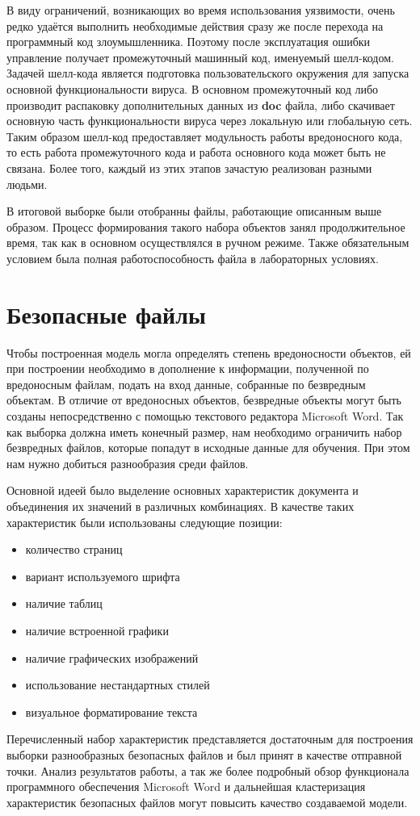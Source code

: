 В виду ограничений, возникающих во время использования уязвимости, очень редко удаётся выполнить необходимые действия сразу же после перехода на программный код злоумышленника.
Поэтому после эксплуатация ошибки управление получает промежуточный машинный код, именуемый шелл-кодом.
Задачей шелл-кода является подготовка пользовательского окружения для запуска основной функциональности вируса.
В основном промежуточный код либо производит распаковку дополнительных данных из \textbf{doc} файла, либо скачивает основную часть функциональности вируса через локальную или глобальную сеть.
Таким образом шелл-код предоставляет модульность работы вредоносного кода, то есть работа промежуточного кода и работа основного кода может быть не связана.
Более того, каждый из этих этапов зачастую реализован разными людьми.

В итоговой выборке были отобранны файлы, работающие описанным выше образом.
Процесс формирования такого набора объектов занял продолжительное время, так как в основном осуществлялся в ручном режиме.
Также обязательным условием была полная работоспособность файла в лабораторных условиях.

\section{Безопасные файлы}

Чтобы построенная модель могла определять степень вредоносности объектов, ей при построении необходимо в дополнение к информации, полученной по вредоносным файлам, подать на вход данные, собранные по безвредным объектам.
В отличие от вредоносных объектов, безвредные объекты могут быть созданы непосредственно с помощью текстового редактора Microsoft Word.
Так как выборка должна иметь конечный размер, нам необходимо ограничить набор безвредных файлов, которые попадут в исходные данные для обучения.
При этом нам нужно добиться разнообразия среди файлов.

Основной идеей было выделение основных характеристик документа и объединения их значений в различных комбинациях.
В качестве таких характеристик были использованы следующие позиции:
\begin{itemize}
\item количество страниц
\item вариант используемого шрифта
\item наличие таблиц
\item наличие встроенной графики
\item наличие графических изображений
\item использование нестандартных стилей
\item визуальное форматирование текста
\end{itemize}

Перечисленный набор характеристик представляется достаточным для построения выборки разнообразных безопасных файлов и был принят в качестве отправной точки.
Анализ результатов работы, а так же более подробный обзор функционала программного обеспечения Microsoft Word и дальнейшая кластеризация характеристик безопасных файлов могут повысить качество создаваемой модели.